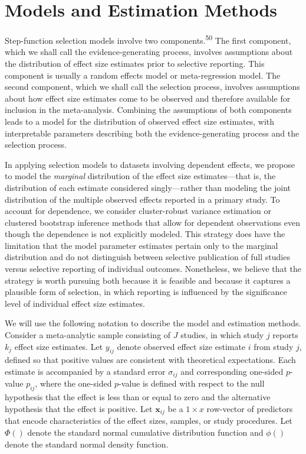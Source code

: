 \documentclass[
  man, donotrepeattitle,floatsintext]{apa7}
\begin{document}
\section{Models and Estimation Methods}\label{model-and-estimation}

Step-function selection models involve two components.\textsuperscript{50}
The first component, which we shall call the evidence-generating process, involves assumptions about the distribution of effect size estimates prior to selective reporting.
This component is usually a random effects model or meta-regression model.
The second component, which we shall call the selection process, involves assumptions about how effect size estimates come to be observed and therefore available for inclusion in the meta-analysis.
Combining the assumptions of both components leads to a model for the distribution of observed effect size estimates, with interpretable parameters describing both the evidence-generating process and the selection process.

In applying selection models to datasets involving dependent effects, we propose to model the \emph{marginal} distribution of the effect size estimates---that is, the distribution of each estimate considered singly---rather than modeling the joint distribution of the multiple observed effects reported in a primary study.
To account for dependence, we consider cluster-robust variance estimation or clustered bootstrap inference methods that allow for dependent observations even though the dependence is not explicitly modeled.
This strategy does have the limitation that the model parameter estimates pertain only to the marginal distribution and do not distinguish between selective publication of full studies versus selective reporting of individual outcomes.
Nonetheless, we believe that the strategy is worth pursuing both because it is feasible and because it captures a plausible form of selection, in which reporting is influenced by the significance level of individual effect size estimates.

We will use the following notation to describe the model and estimation methods. Consider a meta-analytic sample consisting of \(J\) studies, in which study \(j\) reports \(k_j\) effect size estimates. Let \(y_{ij}\) denote observed effect size estimate \(i\) from study \(j\), defined so that positive values are consistent with theoretical expectations. Each estimate is accompanied by a standard error \(\sigma_{ij}\) and corresponding one-sided \(p\)-value \(p_{ij}\), where the one-sided \(p\)-value is defined with respect to the null hypothesis that the effect is less than or equal to zero and the alternative hypothesis that the effect is positive. Let \(\mathbf{x}_{ij}\) be a \(1 \times x\) row-vector of predictors that encode characteristics of the effect sizes, samples, or study procedures. Let \(\Phi()\) denote the standard normal cumulative distribution function and \(\phi()\) denote the standard normal density function.
\end{document}
